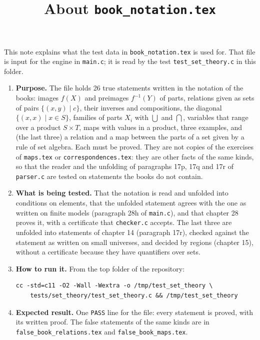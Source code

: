 \documentclass[11pt,a4paper]{article}
\title{About \texttt{book\_notation.tex}}
\author{}
\date{}
\begin{document}
\maketitle
This note explains what the test data in \texttt{book\_notation.tex} is used for. That file is input for the engine in \texttt{main.c}; it is read by the test \texttt{test\_set\_theory.c} in this folder.

\begin{enumerate}
\item \textbf{Purpose.} The file holds 26 true statements written in the notation of the books: images $f(X)$ and preimages $f^{-1}(Y)$ of parts, relations given as sets of pairs $\{(x, y) \mid c\}$, their inverses and compositions, the diagonal $\{(x, x) \mid x \in S\}$, families of parts $X_{i}$ with $\bigcup$ and $\bigcap$, variables that range over a product $S \times T$, maps with values in a product, three examples, and (the last three) a relation and a map between the parts of a set given by a rule of set algebra. Each must be proved. They are not copies of the exercises of \texttt{maps.tex} or \texttt{correspondences.tex}: they are other facts of the same kinds, so that the reader and the unfolding of paragraphs 17p, 17q and 17r of \texttt{parser.c} are tested on statements the books do not contain.

\item \textbf{What is being tested.} That the notation is read and unfolded into conditions on elements, that the unfolded statement agrees with the one as written on finite models (paragraph 28h of \texttt{main.c}), and that chapter 28 proves it, with a certificate that \texttt{checker.c} accepts. The last three are unfolded into statements of chapter 14 (paragraph 17r), checked against the statement as written on small universes, and decided by regions (chapter 15), without a certificate because they have quantifiers over sets.

\item \textbf{How to run it.} From the top folder of the repository:
\begin{verbatim}
cc -std=c11 -O2 -Wall -Wextra -o /tmp/test_set_theory \
    tests/set_theory/test_set_theory.c && /tmp/test_set_theory
\end{verbatim}

\item \textbf{Expected result.} One \texttt{PASS} line for the file: every statement is proved, with its written proof. The false statements of the same kinds are in \texttt{false\_book\_relations.tex} and \texttt{false\_book\_maps.tex}.
\end{enumerate}
\end{document}
